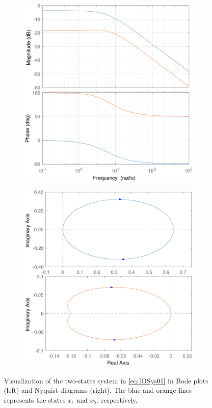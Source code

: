 \documentclass[a4paper,11pt]{book}
\numberwithin{figure}{chapter}
\numberwithin{equation}{chapter}
\numberwithin{table}{chapter}
\theoremstyle{definition}
\begin{document}
\begin{figure}[ht] \centering
	\begin{subfigure}{0.46\textwidth}
    	\includegraphics[width=\textwidth]{chapter2/freq02_1}
    \end{subfigure} \hfill
	\begin{subfigure}{0.47\textwidth}
		\includegraphics[width=\textwidth]{chapter2/freq02_2}
	\end{subfigure}

    \caption{Visualization of the two-states system in \eqref{eq:IOSys01} in Bode plots (left) and Nyquist diagrams (right). The blue and orange lines represents the states $x_1$ and $x_2$, respectively.}
    \label{fig:freq02}
\end{figure}
\end{document}
